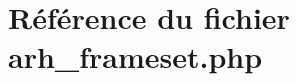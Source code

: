 \hypertarget{arh__frameset_8php}{
\section{R\'{e}f\'{e}rence du fichier arh\_\-frameset.php}
\label{arh__frameset_8php}
}
